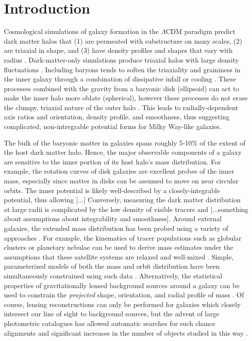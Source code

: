\documentclass[letterpaper,12pt,preprint]{aastex}
\begin{document}
\section{Introduction}

Cosmological simulations of galaxy formation in the $\Lambda$CDM paradigm predict dark matter halos that (1) are permeated with substructure on many scales, (2) are triaxial in shape, and (3) have density profiles and shapes that vary with radius \citep{dubinski91, jing02, kuhlen07, veraciro11}. Dark-matter-only simulations produce triaxial halos \citep{jing02} with large density fluctuations \citep{zemp09}. Including baryons tends to soften the triaxiality and graininess in the inner galaxy through a combination of dissipative infall \citep{dubinski94} or cooling \citep{bryan13}. These processes combined with the gravity from a baryonic disk (ellipsoid) can act to make the inner halo more oblate (spherical), however these processes do not erase the clumpy, triaxial nature of the outer halo \citep[e.g.,][]{pontzen12}. This leads to radially-dependent axis ratios and orientation, density profile, and smoothness, thus suggesting complicated, non-intregrable potential forms for Milky Way-like galaxies.

The bulk of the baryonic matter in galaxies spans roughly 5-10\% of the extent of the host dark matter halo. Hence, the major observable components of a galaxy are sensitive to the inner portion of its host halo's mass distribution. For example, the rotation curves of disk galaxies are excellent probes of the inner mass, especially since matter in disks can be assumed to move on near circular orbits. The inner potential is likely well-described by a closely-integrable potential, thus allowing [...] Conversely, measuring the dark matter distribution at large radii is complicated by the low density of visible tracers and [...something about assumptions about integrability and smoothness]. Around external galaxies, the extended mass distribution has been probed using a variety of approaches \citep[see][for a a complete and detailed review]{courteau13}. For example, the kinematics of tracer populations such as globular clusters or planetary nebulae can be used to derive mass estimates under the assumptions that these satellite systems are relaxed and well-mixed \citep[early investigations include][]{mendez01,cote03}. Simple, parameterized models of both the mass and orbit distribution have been simultaneously constrained using such data \citep[e.g.][]{napolitano11,deason12c}. 
Alternatively, the statistical properties of gravitationally lensed background sources around a galaxy can be used to constrain the \emph{projected} shape, orientation, and radial profile of mass \citep[as done by the Lens Structure and Dynamics Survey described in][]{koopmans02}. Of course, lensing reconstructions can only be performed for galaxies which closely intersect our line of sight to background sources, but the advent of large photometric catalogues has allowed automatic searches for such chance alignments and significant increases in the number of objects studied in this way \citep[e.g. the Sloan Lens ACS Survey, see][]{bolton06}.
\end{document}
